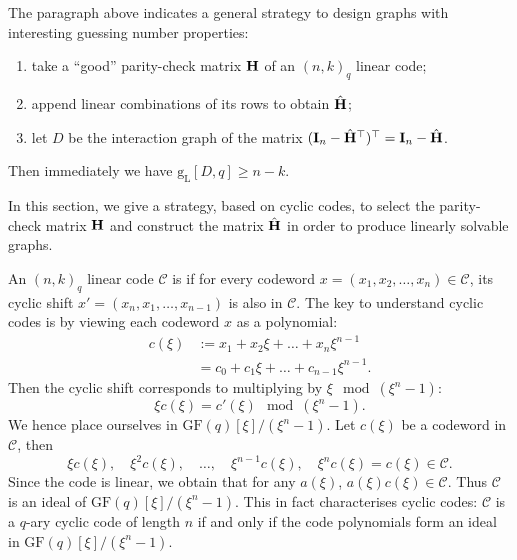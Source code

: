 \documentclass[a4paper, 11pt]{book}
\numberwithin{equation}{section}
\theoremstyle{plain}
\newcommand{\linear}[1]{#1_\mathrm{L}}
\newcommand{\guessing}{\mathrm{g}}
\newcommand{\linearGuessing}{\linear{\guessing}}
\newcommand{\GF}{\mathrm{GF}}
\renewcommand{\(}{\ldbrack}
\renewcommand{\)}{\rdbrack}
\newcommand{\BF}[1]{{\bf\boldmath{#1}\unboldmath}}
\begin{document}
The paragraph above indicates a general strategy to design graphs with interesting guessing number properties:
\begin{enumerate}
	\item take a ``good'' parity-check matrix ${\bf H}$ of an $(n,k)_q$ linear code;
	
	\item append linear combinations of its rows to obtain $\hat{\bf H}$;
	
	\item let $D$ be the interaction graph of the matrix $({\bf I}_n - \hat{\bf H}^\top)^\top = {\bf I}_n - \hat{\bf H}$.
\end{enumerate}
Then immediately we have $\linearGuessing[D,q] \ge n-k$.

In this section, we give a strategy, based on cyclic codes, to select the parity-check matrix ${\bf H}$ and construct the matrix $\hat{\bf H}$ in order to produce linearly solvable graphs.


An $(n,k)_q$ linear code $\mathcal{C}$ is \BF{cyclic} if for every codeword $x = (x_1, x_2, \dots, x_n) \in \mathcal{C}$, its cyclic shift $x' = (x_n, x_1, \dots, x_{n-1})$ is also in $\mathcal{C}$. The key to understand cyclic codes is by viewing each codeword $x$ as a polynomial:
\begin{align*}
	c(\xi) &:= x_1 + x_2 \xi + \dots + x_n \xi^{n-1}\\
	&= c_0 + c_1 \xi + \dots + c_{n-1} \xi^{n-1}.
\end{align*}
Then the cyclic shift corresponds to multiplying by $\xi \mod (\xi^n-1)$:
\[
	\xi c(\xi) = c'(\xi) \mod (\xi^n - 1).
\]
We hence place ourselves in $\GF(q)[\xi] / (\xi^n - 1)$. Let $c(\xi)$ be a codeword in $\mathcal{C}$, then 
\[
	\xi c(\xi), \quad \xi^2 c(\xi), \quad \dots, \quad \xi^{n-1} c(\xi), \quad \xi^n c(\xi) = c(\xi) \in \mathcal{C}.
\]
Since the code is linear, we obtain that for any $a(\xi)$, $a(\xi)c(\xi) \in \mathcal{C}$. Thus $\mathcal{C}$ is an ideal of $\GF(q)[\xi] / (\xi^n - 1)$. This in fact characterises cyclic codes: $\mathcal{C}$ is a $q$-ary cyclic code of length $n$ if and only if the code polynomials form an ideal in $\GF(q)[\xi] / (\xi^n - 1)$.
\end{document}
